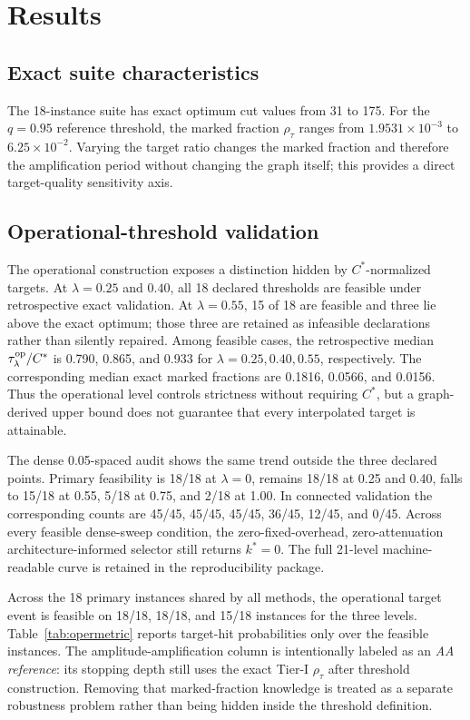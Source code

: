 \documentclass[5p,times]{elsarticle}
\begin{document}
\section{Results}
\subsection{Exact suite characteristics}
The 18-instance suite has exact optimum cut values from 31 to 175. For the $q=0.95$ reference threshold, the marked fraction $\rho_{\tau}$ ranges from $1.9531\times10^{-3}$ to $6.25\times10^{-2}$. Varying the target ratio changes the marked fraction and therefore the amplification period without changing the graph itself; this provides a direct target-quality sensitivity axis.

\subsection{Operational-threshold validation}
The operational construction exposes a distinction hidden by $C^*$-normalized targets. At $\lambda=0.25$ and $0.40$, all 18 declared thresholds are feasible under retrospective exact validation. At $\lambda=0.55$, 15 of 18 are feasible and three lie above the exact optimum; those three are retained as infeasible declarations rather than silently repaired. Among feasible cases, the retrospective median $\tau_\lambda^{\rm op}/C^*$ is 0.790, 0.865, and 0.933 for $\lambda=0.25,0.40,0.55$, respectively. The corresponding median exact marked fractions are 0.1816, 0.0566, and 0.0156. Thus the operational level controls strictness without requiring $C^*$, but a graph-derived upper bound does not guarantee that every interpolated target is attainable.

The dense 0.05-spaced audit shows the same trend outside the three declared points. Primary feasibility is 18/18 at $\lambda=0$, remains 18/18 at 0.25 and 0.40, falls to 15/18 at 0.55, 5/18 at 0.75, and 2/18 at 1.00. In connected validation the corresponding counts are 45/45, 45/45, 45/45, 36/45, 12/45, and 0/45. Across every feasible dense-sweep condition, the zero-fixed-overhead, zero-attenuation architecture-informed selector still returns $k^*=0$. The full 21-level machine-readable curve is retained in the reproducibility package.



Across the 18 primary instances shared by all methods, the operational target event is feasible on 18/18, 18/18, and 15/18 instances for the three levels. Table~\ref{tab:opermetric} reports target-hit probabilities only over the feasible instances. The amplitude-amplification column is intentionally labeled as an \emph{AA reference}: its stopping depth still uses the exact Tier-I $\rho_\tau$ after threshold construction. Removing that marked-fraction knowledge is treated as a separate robustness problem rather than being hidden inside the threshold definition.
\end{document}
